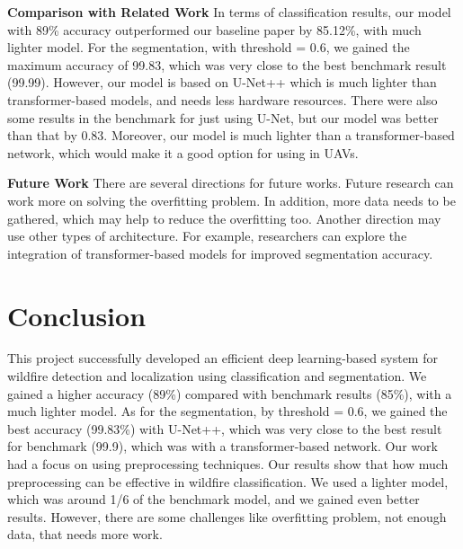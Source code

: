 \documentclass[sigconf, noacm]{acmart}
\begin{document}
\textbf{Comparison with Related Work}
In terms of classification results, our model with 89\% accuracy outperformed our baseline paper by 85.12\%, with much lighter model. 
For the segmentation, with threshold = 0.6, we gained the maximum accuracy of 99.83, which was very close to the best benchmark result (99.99). However, our model is based on U-Net++ which is much lighter than transformer-based models, and needs less hardware resources. There were also some results in the benchmark for just using U-Net, but our model was better than that by 0.83. Moreover, our model is much lighter than a transformer-based network, which would make it a good option for using in UAVs.

\textbf{Future Work}
There are several directions for future works. Future research can work more on solving the overfitting problem. In addition, more data needs to be gathered, which may help to reduce the overfitting too. Another direction may use other types of architecture. For example, researchers can explore the integration of transformer-based models for improved segmentation accuracy.


\section{Conclusion}

This project successfully developed an efficient deep learning-based system for wildfire detection and localization using classification and segmentation. We gained a higher accuracy (89\%) compared with benchmark results (85\%), with a much lighter model. As for the segmentation, by threshold = 0.6, we gained the best accuracy (99.83\%) with U-Net++, which was very close to the best result for benchmark (99.9), which was with a transformer-based network. 
Our work had a focus on using preprocessing techniques. Our results show that how much preprocessing can be effective in wildfire classification. We used a lighter model, which was around 1/6 of the benchmark model, and we gained even better results. However, there are some challenges like overfitting problem, not enough data, that needs more work.

\end{document}
